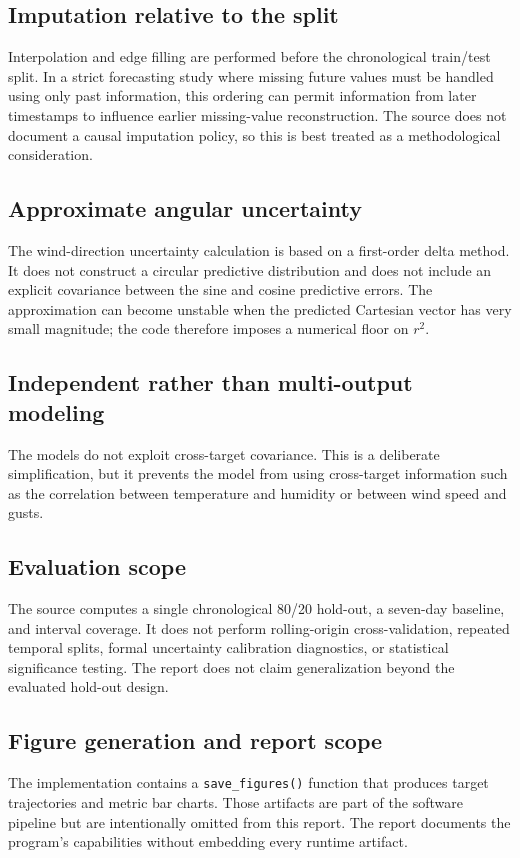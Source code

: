 \documentclass[11pt,a4paper]{article}
\newcommand{\code}[1]{\texttt{#1}}
\begin{document}
\subsection{Imputation relative to the split}
Interpolation and edge filling are performed before the chronological train/test split. In a strict forecasting study where missing future values must be handled using only past information, this ordering can permit information from later timestamps to influence earlier missing-value reconstruction. The source does not document a causal imputation policy, so this is best treated as a methodological consideration.

\subsection{Approximate angular uncertainty}
The wind-direction uncertainty calculation is based on a first-order delta method. It does not construct a circular predictive distribution and does not include an explicit covariance between the sine and cosine predictive errors. The approximation can become unstable when the predicted Cartesian vector has very small magnitude; the code therefore imposes a numerical floor on $r^2$.

\subsection{Independent rather than multi-output modeling}
The models do not exploit cross-target covariance. This is a deliberate simplification, but it prevents the model from using cross-target information such as the correlation between temperature and humidity or between wind speed and gusts.

\subsection{Evaluation scope}
The source computes a single chronological 80/20 hold-out, a seven-day baseline, and interval coverage. It does not perform rolling-origin cross-validation, repeated temporal splits, formal uncertainty calibration diagnostics, or statistical significance testing. The report does not claim generalization beyond the evaluated hold-out design.

\subsection{Figure generation and report scope}
The implementation contains a \code{save\_figures()} function that produces target trajectories and metric bar charts. Those artifacts are part of the software pipeline but are intentionally omitted from this report. The report documents the program's capabilities without embedding every runtime artifact.
\end{document}
